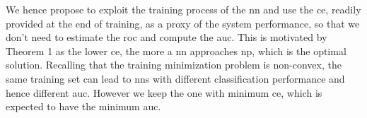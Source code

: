 \documentclass[conference,final]{IEEEtran}
\begin{document}
We hence propose to exploit the training process of the \ac{nn} and use the \ac{ce}, readily provided at the end of training, as a proxy of the system performance, so that we don't need to estimate the \ac{roc} and compute the \ac{auc}. This is motivated by Theorem 1 as the lower \ac{ce}, the more a \ac{nn} approaches \ac{np}, which is the optimal solution. 
Recalling that the training minimization problem is non-convex, the same training set can lead to \acp{nn} with different classification performance and hence different \ac{auc}. However we keep the one with minimum \ac{ce}, which is expected to have the minimum \ac{auc}.


 
\end{document}
